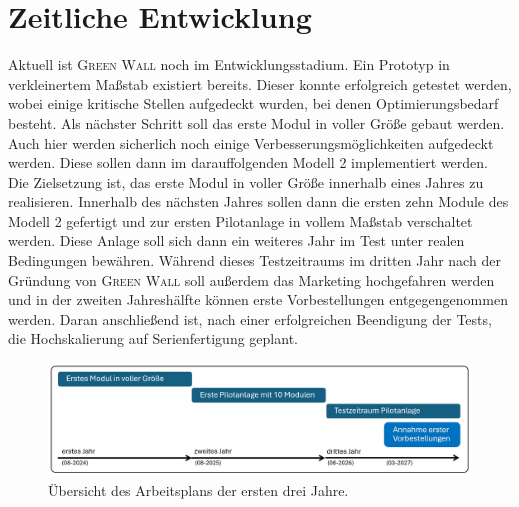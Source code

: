 \chapter{Zeitliche Entwicklung}\label{sec:zeitliche entwicklung}

    Aktuell ist \textsc{Green Wall} noch im Entwicklungsstadium.
    Ein Prototyp in verkleinertem Maßstab existiert bereits.
    Dieser konnte erfolgreich getestet werden, wobei einige kritische Stellen aufgedeckt wurden, bei denen Optimierungsbedarf besteht.
    Als nächster Schritt soll das erste Modul in voller Größe gebaut werden.
    Auch hier werden sicherlich noch einige Verbesserungsmöglichkeiten aufgedeckt werden.
    Diese sollen dann im darauffolgenden Modell 2 implementiert werden.
    Die Zielsetzung ist, das erste Modul in voller Größe innerhalb eines Jahres zu realisieren.
    Innerhalb des nächsten Jahres sollen dann die ersten zehn Module des Modell 2 gefertigt und zur ersten Pilotanlage in vollem Maßstab verschaltet werden.
    Diese Anlage soll sich dann ein weiteres Jahr im Test unter realen Bedingungen bewähren.
    Während dieses Testzeitraums im dritten Jahr nach der Gründung von \textsc{Green Wall} soll außerdem das Marketing hochgefahren werden und in der zweiten Jahreshälfte können erste Vorbestellungen entgegengenommen werden.
    Daran anschließend ist, nach einer erfolgreichen Beendigung der Tests, die Hochskalierung auf Serienfertigung geplant.

    \begin{figure}[h]
        \centering
        \includegraphics[width=\textwidth]{Zeitlicher-Ablauf.jpg}
        \caption[Übersicht des Arbeitsplans der ersten drei Jahre]{Übersicht des Arbeitsplans der ersten drei Jahre.}\label{fig:zeitliche entw}
    \end{figure}
